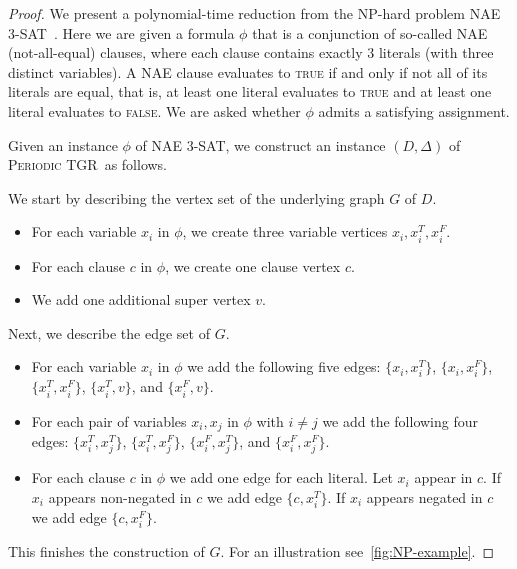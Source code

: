 \documentclass[a4paper,UKenglish,cleveref, autoref, thm-restate, anonymous]{lipics-v2021}
\newcommand{\deltaExact}{\textsc{Periodic TGR}}
\begin{document}
\begin{proof}
	We present a polynomial-time reduction from the NP-hard problem NAE 3-SAT~\cite{Schaefer1978complexity}. Here we are given a formula $\phi$ that is a conjunction of so-called NAE (not-all-equal) clauses, where each clause contains exactly 3 literals (with three distinct variables).
    A NAE clause evaluates to \textsc{true} if and only if not all of its literals are equal, that is, at least one literal evaluates to \textsc{true} and at least one literal evaluates to \textsc{false}.
    We are asked whether $\phi$ admits a satisfying assignment. 

    
    Given an instance $\phi$ of NAE 3-SAT, we construct an instance $(D,\Delta)$ of \deltaExact\ as follows.

 We start by describing the vertex set of the underlying graph $G$ of $D$.
\begin{itemize}
\item For each variable $x_i$ in $\phi$, we create three variable vertices $x_i, x_i^T, x_i^F$.
\item For each clause $c$ in $\phi$, we create one clause vertex $c$.
\item We add one additional super vertex $v$.
\end{itemize}
Next, we describe the edge set of $G$.
\begin{itemize}
\item For each variable $x_i$ in $\phi$ we add the following five edges: 
$\{x_i, x_i^T\}$, $\{x_i, x_i^F\}$, $\{x_i^T, x_i^F\}$, $\{x_i^T, v\}$, and $\{x_i^F,v\}$.
\item For each pair of variables $x_i,x_j$ in $\phi$ with $i \neq j$ we add the following four edges: 
$\{x_i^T, x_j^T\}$, $\{x_i^T,x_j^F\}$, $\{x_i^F,x_j^T\}$, and $\{x_i^F,x_j^F\}$.
\item For each clause $c$ in $\phi$ we add one edge for each literal. Let $x_i$ appear in $c$. If $x_i$ appears non-negated in $c$ we add edge $\{c, x_i^T\}$. 
If $x_i$ appears negated in $c$ we add edge $\{c, x_i^F\}$.
\end{itemize}
This finishes the construction of $G$.
For an illustration see~\cref{fig:NP-example}.


\end{proof}
\end{document}
